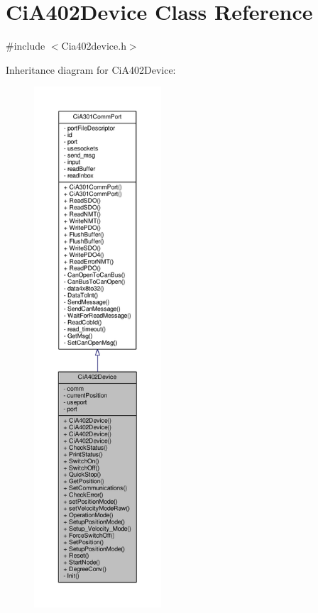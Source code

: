 \hypertarget{classCiA402Device}{}\section{Ci\+A402\+Device Class Reference}
\label{classCiA402Device}


{\ttfamily \#include $<$Cia402device.\+h$>$}



Inheritance diagram for Ci\+A402\+Device\+:\nopagebreak
\begin{figure}[H]
\begin{center}
\leavevmode
\includegraphics[height=550pt]{classCiA402Device__inherit__graph}
\end{center}
\end{figure}


